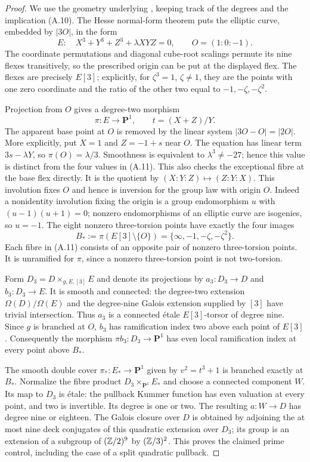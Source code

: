 \begin{proof}
We use the geometry underlying
\citet[\S4, especially Lemma 4.3]{A_BogomolovTschinkel2002},
keeping track of the degrees and the implication (A.10).
The Hesse normal-form theorem
\citep[Lemma 2.1, with the characteristic hypothesis in \S2]{A_ArtebaniDolgachev2009}
puts the elliptic curve, embedded by $|3O|$, in the form
\[
 E:\quad X^3+Y^3+Z^3+\lambda XYZ=0,
 \qquad O=(1:0:-1).
\]
The coordinate permutations and diagonal cube-root scalings
permute its nine flexes transitively, so the prescribed origin
can be put at the displayed flex. The flexes are precisely
$E[3]$; explicitly, for $\zeta^3=1$, $\zeta\ne1$, they are
the points with one zero coordinate and the ratio of the other
two equal to $-1,-\zeta,-\zeta^2$.

Projection from $O$ gives a degree-two morphism
\[
 \pi:E\longrightarrow\mathbf P^1,
 \qquad t=(X+Z)/Y.
\]
The apparent base point at $O$ is removed by the linear system
$|3O-O|=|2O|$. More explicitly, put $X=1$ and $Z=-1+s$
near $O$. The equation has linear term $3s-\lambda Y$, so
$\pi(O)=\lambda/3$. Smoothness is equivalent to
$\lambda^3\ne-27$; hence this value is distinct from the
four values in (A.11). This also checks the exceptional fibre
at the base flex directly.
It is the quotient by $(X:Y:Z)\mapsto(Z:Y:X)$. This involution
fixes $O$ and hence is inversion for the group law with origin
$O$. Indeed a nonidentity involution fixing the origin is a
group endomorphism $u$ with $(u-1)(u+1)=0$; nonzero
endomorphisms of an elliptic curve are isogenies, so $u=-1$.
The eight nonzero three-torsion points have exactly the four
images
\[
 B_*:=\pi(E[3]\setminus\{O\})
       =\{\infty,-1,-\zeta,-\zeta^2\}.                         \tag{A.11}
\]
Each fibre in (A.11) consists of an opposite pair of nonzero
three-torsion points. It is unramified for $\pi$, since a
nonzero three-torsion point is not two-torsion.

Form $D_3=D\times_{g,E,[3]}E$ and denote its projections by
$a_3:D_3\to D$ and $b_3:D_3\to E$. It is smooth and
connected: the degree-two extension $\Omega(D)/\Omega(E)$
and the degree-nine Galois extension supplied by $[3]$ have
trivial intersection. Thus $a_3$ is a connected \'etale
$E[3]$-torsor of degree nine. Since $g$ is branched at $O$,
$b_3$ has ramification index two above each point of $E[3]$.
Consequently the morphism $\pi b_3:D_3\to\mathbf P^1$ has
even local ramification index at every point above $B_*$.

The smooth double cover $\pi_*:E_*\to\mathbf P^1$ given by
$v^2=t^3+1$ is branched exactly at $B_*$. Normalize the fibre
product $D_3\times_{\mathbf P^1}E_*$ and choose a connected
component $W$. Its map to $D_3$ is \'etale: the pullback
Kummer function has even valuation at every point, and two
is invertible. Its degree is one or two. The resulting
$a:W\to D$ has degree nine or eighteen. The Galois closure
over $D$ is obtained by adjoining the at most nine deck
conjugates of this quadratic extension over $D_3$; its group
is an extension of a subgroup of $(\mathbb Z/2)^9$ by $(\mathbb Z/3)^2$.
This proves the claimed prime control, including the case of
a split quadratic pullback.


\end{proof}
